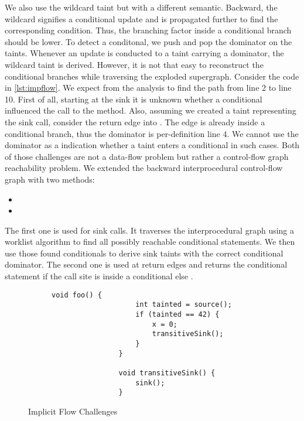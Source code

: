 \documentclass[../draft.tex]{subfiles}
\begin{document}
    We also use the wildcard taint but with a different semantic.
    Backward, the wildcard signifies a conditional update and is propagated further to find the corresponding condition.
    Thus, the branching factor inside a conditional branch should be lower.
    To detect a conditonal, we push and pop the dominator on the taints.
    Whenever an update is conducted to a taint carrying a dominator, the wildcard taint is derived.
    However, it is not that easy to reconstruct the conditional branches while traversing the exploded supergraph.
    Consider the code in \autoref{lst:impflow}.
    We expect from the analysis to find the path from line 2 to line 10.
    First of all, starting at the sink it is unknown whether a conditional influenced the call to the  method.
    Also, assuming we created a taint representing the sink call, consider the return edge into .
    The edge is already inside a conditional branch, thus the dominator is per-definition line 4.
    We cannot use the dominator as a indication whether a taint enters a conditional in such cases.
    Both of those challenges are not a data-flow problem but rather a control-flow graph reachability problem.
    We extended the backward interprocedural control-flow graph with two methods:
    \begin{itemize}
        \item {}
        \item {}
    \end{itemize}
    The first one is used for sink calls.
    It traverses the interprocedural graph using a worklist algorithm to find all possibly reachable conditional statements.
    We then use those found conditionals to derive sink taints with the correct conditional dominator.
    The second one is used at return edges and returns the conditional statement if the call site is inside a conditional else .

    \begin{figure}[tbp]
        \centering
        \begin{subfigure}[b]{0.45\textwidth}
            \centering
            \begin{lstlisting}[gobble=16]
                void foo() {
                    int tainted = source();
                    if (tainted == 42) {
                        x = 0;
                        transitiveSink();
                    }
                }

                void transitiveSink() {
                    sink();
                }
            \end{lstlisting}
        \end{subfigure}
        \caption{Implicit Flow Challenges}
        \label{lst:impflow}
    \end{figure}
\end{document}
